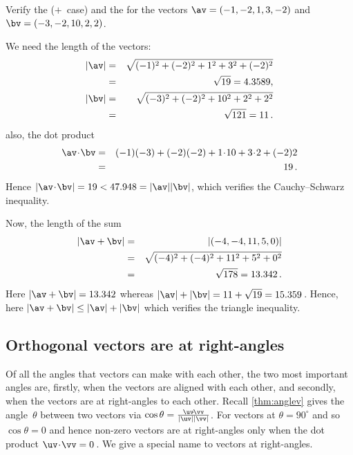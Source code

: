 \begin{example} \label{eg:}
Verify the  (\(+\)~case) and the  for the vectors \(\av=(-1,-2,1,3,-2)\) and \(\bv=(-3,-2,10,2,2)\).
\begin{solution} 
We need the length of the vectors:
\begin{eqnarray*}
|\av|&=&\sqrt{(-1)^2+(-2)^2+1^2+3^2+(-2)^2}
\\&=&\sqrt{19}=4.3589,
\\|\bv|&=&\sqrt{(-3)^2+(-2)^2+10^2+2^2+2^2}
\\&=&\sqrt{121}=11\,.
\end{eqnarray*}
also, the dot product
\begin{eqnarray*}
\av\cdot\bv
&=&(-1)(-3)+(-2)(-2)+1\cdot10+3\cdot2+(-2)2
\\&=&19\,.
\end{eqnarray*}
Hence \(|\av\cdot\bv|=19<47.948=|\av||\bv|\), which verifies the Cauchy--Schwarz inequality.

Now, the length of the sum
\begin{eqnarray*}
|\av+\bv|&=&|(-4,-4,11,5,0)|
\\&=&\sqrt{(-4)^2+(-4)^2+11^2+5^2+0^2}
\\&=&\sqrt{178}=13.342\,.
\end{eqnarray*}
Here \(|\av+\bv|=13.342\) whereas \(|\av|+|\bv|=11+\sqrt{19}=15.359\)\,.
Hence, here \(|\av+\bv|\leq|\av|+|\bv|\) which verifies the triangle inequality.
\end{solution}
\end{example}








\subsection{Orthogonal vectors are at right-angles}
\label{sec:ovra}


Of all the angles that vectors can make with each other, the two most important angles are, firstly, when the vectors are aligned with each other, and secondly, when the vectors are at right-angles to each other.
Recall \autoref{thm:anglev} gives the angle~\(\theta\) between two vectors via \(\cos\theta=\frac{\uv\cdot\vv}{|\uv||\vv|}\).
For vectors at  \(\theta=90^\circ\) and so \(\cos\theta=0\) and hence non-zero vectors are at right-angles only when the dot product \(\uv\cdot\vv=0\)\,.
We give a special name to vectors at right-angles.


